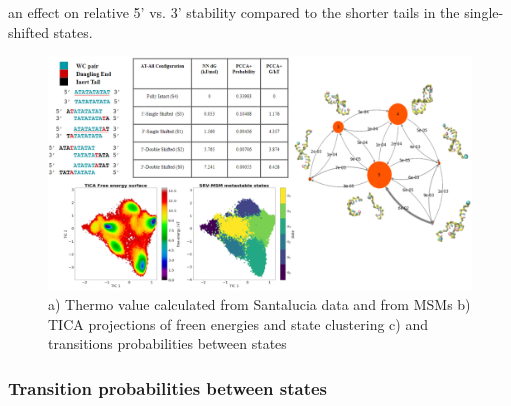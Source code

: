 \documentclass[journal=jpcbfk,manuscript=article]{achemso}
\begin{document}
an effect on relative 5' vs. 3' stability compared to the shorter tails in the single-shifted states.


\begin{figure}[ht!]
	\begin{center}
        \includegraphics[width=\textwidth]{Figs/figs_0804/AT-all_in_one.PNG}
        \caption{a) Thermo value calculated from Santalucia data and from MSMs b) TICA projections of freen energies and state clustering c) and transitions probabilities between states}

        \label{fig:AT-all_in_one}
	\end{center}
\end{figure}

\subsubsection{Transition probabilities between states}
\end{document}
